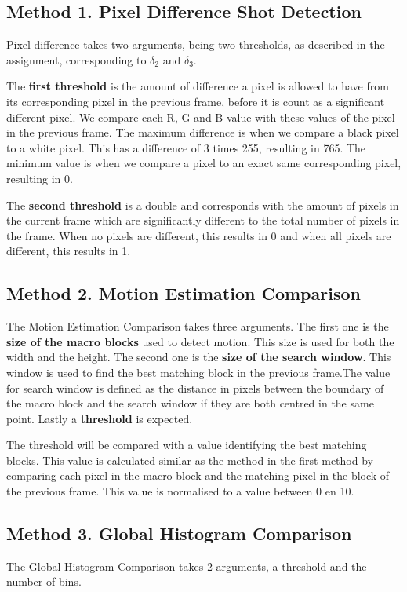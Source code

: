 \documentclass[a4paper,10pt]{article}
\begin{document}
\subsection{Method 1. Pixel Difference Shot Detection}
Pixel difference takes two arguments, being two thresholds, as described in the assignment, corresponding to $\delta_2$ and $\delta_3$. 

The \textbf{first threshold} is the amount of difference a pixel is allowed to have from its corresponding pixel in the previous frame, before it is count as a significant different pixel. We compare each R, G and B value with these values of the pixel in the previous frame. The maximum difference is when we compare a black pixel to a white pixel. This has a difference of 3 times 255, resulting in 765. The minimum value is when we compare a pixel to an exact
same corresponding pixel, resulting in 0.

The \textbf{second threshold} is a double and corresponds with the amount of pixels in the current frame which are significantly different to the total number of pixels in the frame. When no pixels are different, this results in 0 and when all pixels are different, this results in 1.

\subsection{Method 2. Motion Estimation Comparison }
The Motion Estimation Comparison takes three arguments. The first one is the \textbf{size of the macro blocks} used to detect motion. This size is used for both the width and the height. The second one is the \textbf{size of the search window}. This window is used to find the best matching block in the previous frame.The value for search window is defined as the distance in pixels between the boundary of the macro block and the search window if they are both centred in the same point. Lastly a \textbf{threshold} is expected.

The threshold will be compared with a value identifying the best matching blocks. This value is calculated similar as the method in the first method by comparing each pixel in the macro block and the matching pixel in the block of the previous frame. This value is normalised to a value between 0 en 10.

\subsection{Method 3. Global Histogram Comparison}
The Global Histogram Comparison takes 2 arguments, a threshold and the number of bins.
\end{document}
